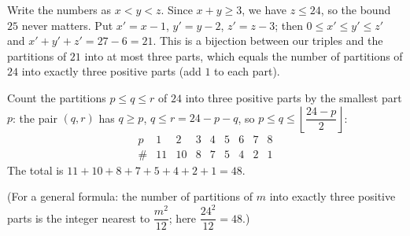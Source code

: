 Write the numbers as $x<y<z$. Since $x+y\ge3$, we have $z\le24$, so the bound $25$ never matters. Put $x'=x-1$, $y'=y-2$, $z'=z-3$; then $0\le x'\le y'\le z'$ and $x'+y'+z'=27-6=21$. This is a bijection between our triples and the partitions of $21$ into at most three parts, which equals the number of partitions of $24$ into exactly three positive parts (add $1$ to each part).

Count the partitions $p\le q\le r$ of $24$ into three positive parts by the smallest part $p$: the pair $(q,r)$ has $q\ge p$, $q\le r=24-p-q$, so $p\le q\le\left\lfloor\dfrac{24-p}{2}\right\rfloor$:
\[
\begin{array}{c|cccccccc}
p&1&2&3&4&5&6&7&8\\ \hline
\#&11&10&8&7&5&4&2&1
\end{array}
\]
The total is $11+10+8+7+5+4+2+1=\boxed{48}$.

(For a general formula: the number of partitions of $m$ into exactly three positive parts is the integer nearest to $\dfrac{m^2}{12}$; here $\dfrac{24^2}{12}=48$.)
